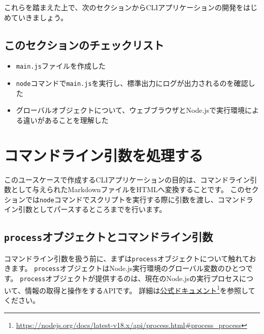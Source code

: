 これらを踏まえた上で、次のセクションからCLIアプリケーションの開発をはじめていきましょう。

\hypertarget{section-checklist}{%
\subsection{このセクションのチェックリスト}\label{section-checklist}}

\begin{itemize}
\item
  \texttt{main.js}ファイルを作成した
\item
  \texttt{node}コマンドで\texttt{main.js}を実行し、標準出力にログが出力されるのを確認した
\item
  グローバルオブジェクトについて、ウェブブラウザとNode.jsで実行環境による違いがあることを理解した
\end{itemize}

\hypertarget{processing-commandline-args}{%
\section{コマンドライン引数を処理する}\label{processing-commandline-args}}

このユースケースで作成するCLIアプリケーションの目的は、コマンドライン引数として与えられたMarkdownファイルをHTMLへ変換することです。
このセクションでは\texttt{node}コマンドでスクリプトを実行する際に引数を渡し、コマンドライン引数としてパースするところまでを行います。

\hypertarget{process-object-and-commandline-args}{%
\subsection{\texorpdfstring{\texttt{process}オブジェクトとコマンドライン引数}{processオブジェクトとコマンドライン引数}}\label{process-object-and-commandline-args}}

コマンドライン引数を扱う前に、まずは\texttt{process}オブジェクトについて触れておきます。
\texttt{process}オブジェクトはNode.js実行環境のグローバル変数のひとつです。
\texttt{process}オブジェクトが提供するのは、現在のNode.jsの実行プロセスについて、情報の取得と操作をするAPIです。
詳細は\href{https://nodejs.org/docs/latest-v18.x/api/process.html\#process_process}{公式ドキュメント}\footnote{\url{https://nodejs.org/docs/latest-v18.x/api/process.html\#process_process}}を参照してください。

